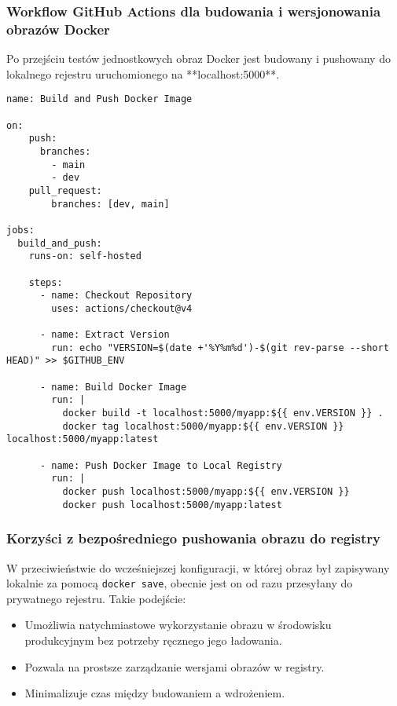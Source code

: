 \subsubsection{Workflow GitHub Actions dla budowania i wersjonowania obrazów Docker}

Po przejściu testów jednostkowych obraz Docker jest budowany i pushowany do lokalnego rejestru uruchomionego na **localhost:5000**.

\begin{verbatim}
name: Build and Push Docker Image

on:
    push:
      branches:
        - main
        - dev
    pull_request:
        branches: [dev, main]

jobs:
  build_and_push:
    runs-on: self-hosted

    steps:
      - name: Checkout Repository
        uses: actions/checkout@v4

      - name: Extract Version
        run: echo "VERSION=$(date +'%Y%m%d')-$(git rev-parse --short HEAD)" >> $GITHUB_ENV

      - name: Build Docker Image
        run: |
          docker build -t localhost:5000/myapp:${{ env.VERSION }} .
          docker tag localhost:5000/myapp:${{ env.VERSION }} localhost:5000/myapp:latest

      - name: Push Docker Image to Local Registry
        run: |
          docker push localhost:5000/myapp:${{ env.VERSION }}
          docker push localhost:5000/myapp:latest
\end{verbatim}

\subsubsection{Korzyści z bezpośredniego pushowania obrazu do registry}

W przeciwieństwie do wcześniejszej konfiguracji, w której obraz był zapisywany lokalnie za pomocą \texttt{docker save}, obecnie jest on od razu przesyłany do prywatnego rejestru. Takie podejście:
\begin{itemize}
    \item Umożliwia natychmiastowe wykorzystanie obrazu w środowisku produkcyjnym bez potrzeby ręcznego jego ładowania.
    \item Pozwala na prostsze zarządzanie wersjami obrazów w registry.
    \item Minimalizuje czas między budowaniem a wdrożeniem.
\end{itemize}

